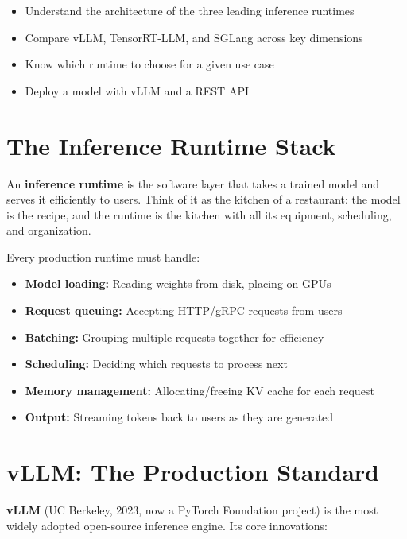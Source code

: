 \documentclass[11pt, twoside, openright]{book}
\newenvironment{learningobjectives}
  {\begin{tcolorbox}[enhanced, breakable,
    colback={rgb,255:red,232;green,240;blue,255},
    colframe=NavyBlue, boxrule=1.5pt, arc=4pt,
    title={\bfseries Learning Objectives},
    fonttitle=\bfseries\color{white},
    attach boxed title to top left={yshift=-2mm, xshift=5mm},
    boxed title style={colback=NavyBlue, arc=2pt}]
  \begin{itemize}[leftmargin=1.5em, itemsep=2pt]}
  {\end{itemize}\end{tcolorbox}}
\newcommand{\keyterm}[1]{\textbf{\color{AccentOrange}#1}}
\begin{document}
\begin{learningobjectives}
  \item Understand the architecture of the three leading inference runtimes
  \item Compare vLLM, TensorRT-LLM, and SGLang across key dimensions
  \item Know which runtime to choose for a given use case
  \item Deploy a model with vLLM and a REST API
\end{learningobjectives}

\section{The Inference Runtime Stack}

An \keyterm{inference runtime} is the software layer that
takes a trained model and serves it efficiently to users.  Think of it as the
kitchen of a restaurant: the model is the recipe, and the runtime is the kitchen
with all its equipment, scheduling, and organization.

Every production runtime must handle:
\begin{itemize}
  \item \textbf{Model loading:} Reading weights from disk, placing on GPUs
  \item \textbf{Request queuing:} Accepting HTTP/gRPC requests from users
  \item \textbf{Batching:} Grouping multiple requests together for efficiency
  \item \textbf{Scheduling:} Deciding which requests to process next
  \item \textbf{Memory management:} Allocating/freeing KV cache for each request
  \item \textbf{Output:} Streaming tokens back to users as they are generated
\end{itemize}

\section{vLLM: The Production Standard}

\keyterm{vLLM} (UC Berkeley, 2023, now a PyTorch Foundation project) is the
most widely adopted open-source inference engine.  Its core innovations:
\end{document}
